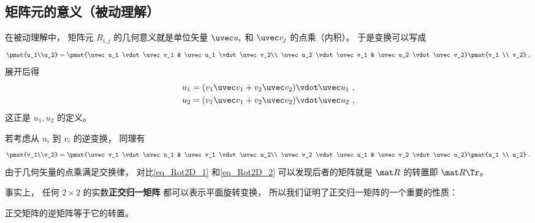 \subsection{矩阵元的意义（被动理解）}
在被动理解中， 矩阵元 $R_{i,j}$ 的几何意义就是单位矢量 $\uvec u_i$ 和 $\uvec v_j$ 的点乘（内积）。 于是变换可以写成
\begin{equation}\label{eq_Rot2D_1}
\pmat{u_1\\u_2} = \pmat{\uvec u_1 \vdot \uvec v_1 & \uvec u_1 \vdot \uvec v_2\\ \uvec u_2 \vdot \uvec v_1 & \uvec u_2 \vdot \uvec v_2} \pmat{v_1 \\ v_2}~,
\end{equation}
展开后得
\begin{equation}
\begin{aligned}
&u_1 = (v_1 \uvec v_1 + v_2 \uvec v_2) \vdot \uvec u_1~,\\
&u_2 = (v_1 \uvec v_1 + v_2 \uvec v_2) \vdot \uvec u_2~,
\end{aligned}
\end{equation}
这正是 $u_1, u_2$ 的定义。

若考虑从 $u_i$ 到 $v_i$ 的逆变换， 同理有
\begin{equation}\label{eq_Rot2D_2}
\pmat{v_1\\v_2} = \pmat{\uvec v_1 \vdot \uvec u_1 & \uvec v_1 \vdot \uvec u_2\\ \uvec v_2 \vdot \uvec u_1 & \uvec v_2 \vdot \uvec u_2} \pmat{u_1 \\ u_2}~.
\end{equation}
由于几何矢量的点乘满足交换律， 对比\autoref{eq_Rot2D_1} 和\autoref{eq_Rot2D_2} 可以发现后者的矩阵就是 $\mat R$ 的转置即 $\mat R\Tr$。

事实上， 任何 $2\times2$ 的实数\textbf{正交归一矩阵} 都可以表示平面旋转变换， 所以我们证明了正交归一矩阵的一个重要的性质：
\begin{theorem}{}
正交矩阵的逆矩阵等于它的转置。
\end{theorem}
